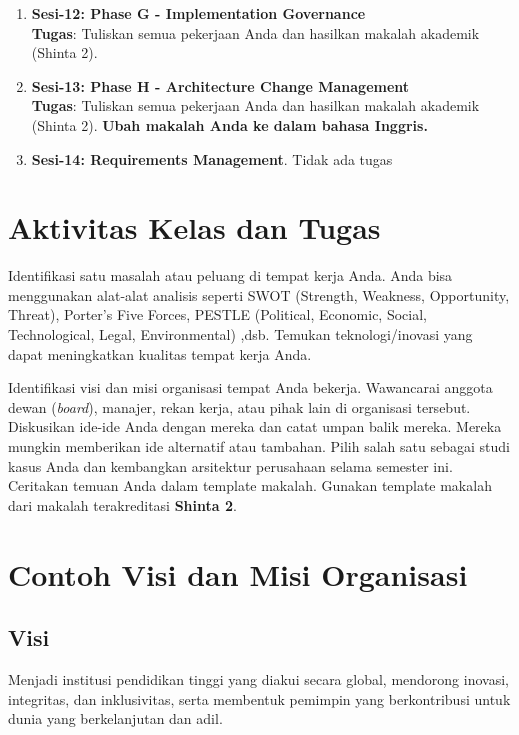 \begin{enumerate}
	\item \textbf{Sesi-12: Phase G - Implementation Governance} \\
	\textbf{Tugas}: Tuliskan semua pekerjaan Anda dan hasilkan makalah akademik (Shinta 2).
	
	\item \textbf{Sesi-13: Phase H - Architecture Change Management} \\
	\textbf{Tugas}: Tuliskan semua pekerjaan Anda dan hasilkan makalah akademik (Shinta 2). \textbf{Ubah makalah Anda ke dalam bahasa Inggris.}
	
	\item \textbf{Sesi-14: Requirements Management}. Tidak ada tugas
\end{enumerate}


\section{Aktivitas Kelas dan Tugas}
Identifikasi satu masalah atau peluang di tempat kerja Anda. Anda bisa menggunakan alat-alat analisis seperti SWOT (Strength, Weakness, Opportunity, Threat), Porter's Five Forces, PESTLE (Political, Economic, Social, Technological, Legal, Environmental) ,dsb. Temukan teknologi/inovasi yang dapat meningkatkan kualitas tempat kerja Anda.

Identifikasi visi dan misi organisasi tempat Anda bekerja. Wawancarai anggota dewan (\textit{board}), manajer, rekan kerja, atau pihak lain di organisasi tersebut. Diskusikan ide-ide Anda dengan mereka dan catat umpan balik mereka. Mereka mungkin memberikan ide alternatif atau tambahan. Pilih salah satu sebagai studi kasus Anda dan kembangkan arsitektur perusahaan selama semester ini. Ceritakan temuan Anda dalam template makalah. Gunakan template makalah dari makalah terakreditasi \textbf{Shinta 2}.


\section{Contoh Visi dan Misi Organisasi}

\subsection{Visi}
Menjadi institusi pendidikan tinggi yang diakui secara global, mendorong inovasi, integritas, dan inklusivitas, serta membentuk pemimpin yang berkontribusi untuk dunia yang berkelanjutan dan adil.

